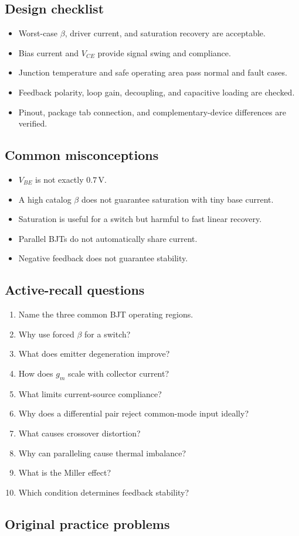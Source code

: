 \documentclass[10pt,letterpaper]{article}
\begin{document}
\subsection{Design checklist}
\begin{itemize}
  \item Worst-case $\beta$, driver current, and saturation recovery are acceptable.
  \item Bias current and $V_{CE}$ provide signal swing and compliance.
  \item Junction temperature and safe operating area pass normal and fault cases.
  \item Feedback polarity, loop gain, decoupling, and capacitive loading are checked.
  \item Pinout, package tab connection, and complementary-device differences are verified.
\end{itemize}\subsection{Common misconceptions}
\begin{itemize}
  \item $V_{BE}$ is not exactly $0.7\,\mathrm{V}$.
  \item A high catalog $\beta$ does not guarantee saturation with tiny base current.
  \item Saturation is useful for a switch but harmful to fast linear recovery.
  \item Parallel BJTs do not automatically share current.
  \item Negative feedback does not guarantee stability.
\end{itemize}\subsection{Active-recall questions}
\begin{enumerate}
  \item Name the three common BJT operating regions.
  \item Why use forced $\beta$ for a switch?
  \item What does emitter degeneration improve?
  \item How does $g_m$ scale with collector current?
  \item What limits current-source compliance?
  \item Why does a differential pair reject common-mode input ideally?
  \item What causes crossover distortion?
  \item Why can paralleling cause thermal imbalance?
  \item What is the Miller effect?
  \item Which condition determines feedback stability?
\end{enumerate}\subsection{Original practice problems}
\end{document}
